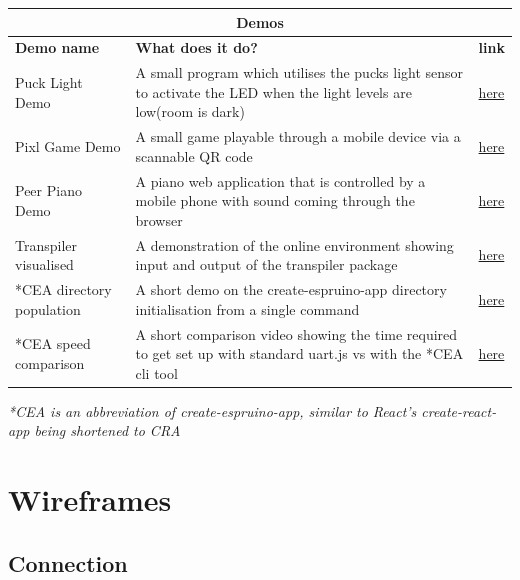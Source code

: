 \documentclass{l4proj}
\begin{document}
\begin{appendices}
\begin{tabular}{|p{4cm}|p{8.25cm}|p{0.75cm}|}
 \hline
 \multicolumn{3}{|c|}{Demos} \\
 \hline
 \textbf{Demo name}  & \textbf{What does it do?} & \textbf{link}\\
 \hline
Puck Light Demo  & A small program which utilises the pucks light sensor to activate the LED when the light levels
are low(room is dark)& \href{https://demos-mu.vercel.app/demo/light-sensor}{here}\\ \hline
Pixl Game Demo& A small game playable through a mobile device via a scannable QR code&\href{https://demos-mu.vercel.app/demo/pixl-dinosaur-demo}{here}\\ \hline
Peer Piano Demo&A piano web application that is controlled by a mobile phone with sound coming through the browser&\href{https://demos-mu.vercel.app/demo/piano-demo}{here} \\ \hline
Transpiler visualised&A demonstration of the online environment showing input and output of the transpiler package&\href{https://demos-mu.vercel.app/demo/transpiler}{here} \\ \hline
*CEA directory population&A short demo on the create-espruino-app directory initialisation from a single command&\href{https://demos-mu.vercel.app/demo/create-espruino-app}{here} \\ \hline
*CEA speed comparison&A short comparison video showing the time required to get set up with standard uart.js vs with the *CEA cli tool&\href{https://demos-mu.vercel.app/demo/create-espruino-app-speed-comp}{here}\\
 \hline
    \end{tabular}

\textit{*CEA is an abbreviation of create-espruino-app, similar to React's create-react-app being shortened to CRA}

\chapter{Wireframes}
\label{appendix:wireframes}

\section{Connection}


\end{appendices}
\end{document}
